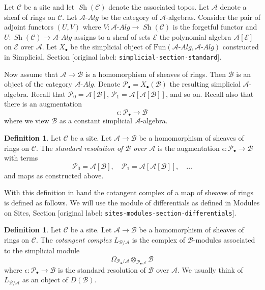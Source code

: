 \documentclass[10pt,a4paper]{article}
\theoremstyle{plain}
\theoremstyle{definition}
\newtheorem{definition}[subsection]{Definition}
\theoremstyle{remark}
\numberwithin{equation}{subsection}
\def\Sh{\mathop{\mathit{Sh}}\nolimits}
\begin{document}
\medskip\noindent
Let $\mathcal{C}$ be a site and let $\Sh(\mathcal{C})$ denote the
associated topos. Let $\mathcal{A}$ denote a sheaf of rings
on $\mathcal{C}$. Let $\mathcal{A}\textit{-Alg}$ be the category of
$\mathcal{A}$-algebras. Consider the pair of adjoint functors $(U, V)$ where
$V : \mathcal{A}\textit{-Alg} \to \Sh(\mathcal{C})$ is the forgetful functor and
$U : \Sh(\mathcal{C}) \to \mathcal{A}\textit{-Alg}$ assigns to a sheaf of sets
$\mathcal{E}$ the polynomial algebra $\mathcal{A}[\mathcal{E}]$ on
$\mathcal{E}$ over $\mathcal{A}$.
Let $X_\bullet$ be the simplicial object of
$\text{Fun}(\mathcal{A}\textit{-Alg}, \mathcal{A}\textit{-Alg})$
constructed in
Simplicial, Section \textnormal{[original label: \nolinkurl{simplicial-section-standard}]}.

\medskip\noindent
Now assume that $\mathcal{A} \to \mathcal{B}$ is a homomorphism of sheaves
of rings. Then $\mathcal{B}$ is an object of the category
$\mathcal{A}\textit{-Alg}$. Denote
$\mathcal{P}_\bullet = X_\bullet(\mathcal{B})$ the resulting
simplicial $\mathcal{A}$-algebra.
Recall that
$\mathcal{P}_0 = \mathcal{A}[\mathcal{B}]$,
$\mathcal{P}_1 = \mathcal{A}[\mathcal{A}[\mathcal{B}]]$, and so on.
Recall also that there is an augmentation
$$
\epsilon : \mathcal{P}_\bullet \longrightarrow \mathcal{B}
$$
where we view $\mathcal{B}$ as a constant simplicial $\mathcal{A}$-algebra.

\begin{definition}
\label{definition-standard-resolution-sheaves-rings}
Let $\mathcal{C}$ be a site.
Let $\mathcal{A} \to \mathcal{B}$ be a homomorphism of sheaves of rings
on $\mathcal{C}$. The {\it standard resolution of $\mathcal{B}$ over
$\mathcal{A}$} is the augmentation
$\epsilon : \mathcal{P}_\bullet \to \mathcal{B}$
with terms
$$
\mathcal{P}_0 = \mathcal{A}[\mathcal{B}],\quad
\mathcal{P}_1 = \mathcal{A}[\mathcal{A}[\mathcal{B}]],\quad \ldots
$$
and maps as constructed above.
\end{definition}

\noindent
With this definition in hand the cotangent complex of a map of sheaves
of rings is defined as follows.
We will use the module of differentials as defined in
Modules on Sites, Section \textnormal{[original label: \nolinkurl{sites-modules-section-differentials}]}.

\begin{definition}
\label{definition-cotangent-complex-morphism-sheaves-rings}
Let $\mathcal{C}$ be a site.
Let $\mathcal{A} \to \mathcal{B}$ be a homomorphism of sheaves of rings
on $\mathcal{C}$.
The {\it cotangent complex} $L_{\mathcal{B}/\mathcal{A}}$
is the complex of $\mathcal{B}$-modules associated to the
simplicial module
$$
\Omega_{\mathcal{P}_\bullet/\mathcal{A}}
\otimes_{\mathcal{P}_\bullet, \epsilon} \mathcal{B}
$$
where $\epsilon : \mathcal{P}_\bullet \to \mathcal{B}$
is the standard resolution of $\mathcal{B}$ over
$\mathcal{A}$. We usually think of $L_{\mathcal{B}/\mathcal{A}}$
as an object of $D(\mathcal{B})$.
\end{definition}
\end{document}

